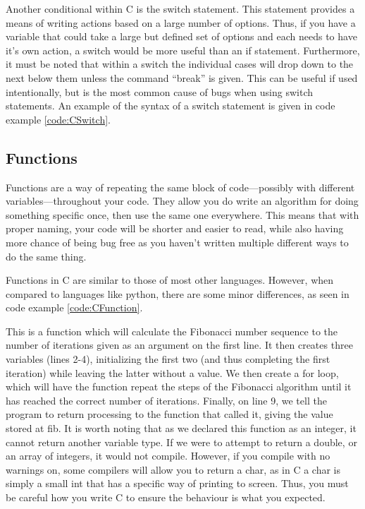 \documentclass[a4paper,11pt]{report}
\begin{document}
			Another conditional within C is the switch statement. 
			This statement provides a means of writing actions based on a large number of options. 
			Thus, if you have a variable that could take a large but defined set of options and each needs to have it's own action, a switch would be more useful than an if statement. 
			Furthermore, it must be noted that within a switch the individual cases will drop down to the next below them unless the command ``break'' is given. 
			This can be useful if used intentionally, but is the most common cause of bugs when using switch statements. 
			An example of the syntax of a switch statement is given in code example \ref{code:CSwitch}.

			\begin{code}
				C}]{./CSwitch.c}
				\caption{Example of the C Switch Statement}
				\label{code:CSwitch}
			\end{code}
		\subsection{Functions}
			Functions are a way of repeating the same block of code---possibly with different variables---throughout your code. 
			They allow you do write an algorithm for doing something specific once, then use the same one everywhere. 
			This means that with proper naming, your code will be shorter and easier to read, while also having more chance of being bug free as you haven't written multiple different ways to do the same thing. 

			Functions in C are similar to those of most other languages. 
			However, when compared to languages like python, there are some minor differences, as seen in code example \ref{code:CFunction}.
			\begin{code}
				C}]{./CFunction.c}
				\caption{Example of a C Function}
				\label{code:CFunction}
			\end{code}
			This is a function which will calculate the Fibonacci number sequence to the number of iterations given as an argument on the first line. 
			It then creates three variables (lines 2-4), initializing the first two (and thus completing the first iteration) while leaving the latter without a value. 
			We then create a for loop, which will have the function repeat the steps of the Fibonacci algorithm until it has reached the correct number of iterations. 
			Finally, on line 9, we tell the program to return processing to the function that called it, giving the value stored at fib. 
			It is worth noting that as we declared this function as an integer, it cannot return another variable type. 
			If we were to attempt to return a double, or an array of integers, it would not compile. 
			However, if you compile with no warnings on, some compilers will allow you to return a char, as in C a char is simply a small int that has a specific way of printing to screen. 
			Thus, you must be careful how you write C to ensure the behaviour is what you expected. 
\end{document}
